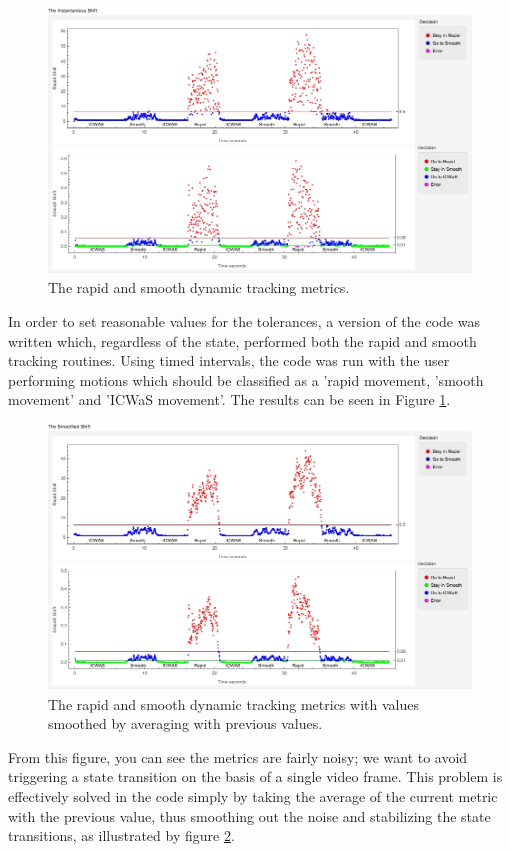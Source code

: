 \begin{figure}[tbph]
\centering
\includegraphics[width=0.7\linewidth]{Chapter4/Figs/instantaniousShiftGrfx}
\caption{The rapid and smooth dynamic tracking metrics.}
\label{fig:instantaniousshiftgrfx}
\end{figure}

In order to set reasonable values for the tolerances, a version of the code was written which, regardless of the state, performed both the rapid and smooth tracking routines. Using timed intervals, the code was run with the user performing motions which should be classified as a 'rapid movement, 'smooth movement' and 'ICWaS movement'. The results can be seen in Figure \ref{fig:instantaniousshiftgrfx}.

\begin{figure}[tbph]
\centering
\includegraphics[width=0.7\linewidth]{Chapter4/Figs/smoothedShiftGrfx}
\caption{The rapid and smooth dynamic tracking metrics with values smoothed by averaging with previous values.}
\label{fig:smoothedshiftgrfx}
\end{figure}

From this figure, you can see the metrics are fairly noisy; we want to avoid triggering a state transition on the basis of a single video frame. This problem is effectively solved in the code simply by taking the average of the current metric with the previous value, thus smoothing out the noise and stabilizing the state transitions, as illustrated by figure \ref{fig:smoothedshiftgrfx}.

